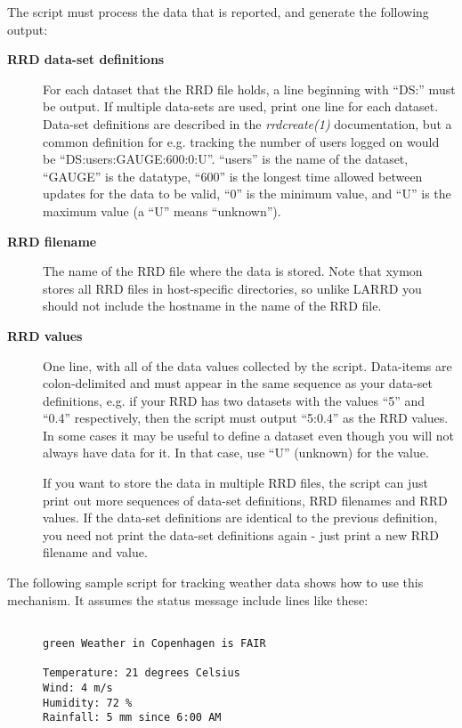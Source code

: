   The script must process the data that is reported, and generate the following output: 


 \begin{description}
\item[\textbf{RRD data-set definitions}
] For each dataset that the RRD file holds, a line beginning with ``DS:'' must be output. If multiple data-sets are used, print one line for each dataset.  
 Data-set definitions are described in the \emph{rrdcreate(1)}
 documentation, but a common definition for e.g. tracking the number of users logged on would be ``DS:users:GAUGE:600:0:U''. ``users'' is the name of the dataset, ``GAUGE'' is the datatype, ``600'' is the longest time allowed between updates for the data to be valid, ``0'' is the minimum value, and ``U'' is the maximum value (a ``U'' means ``unknown''). 
\item[\textbf{RRD filename}
] The name of the RRD file where the data is stored. Note that xymon stores all RRD files in host-specific directories, so unlike LARRD you should not include the hostname in the name of the RRD file. 
\item[\textbf{RRD values}
] One line, with all of the data values collected by the script. Data-items are colon-delimited and must appear in the same sequence as your data-set definitions, e.g. if your RRD has two datasets with the values ``5'' and ``0.4'' respectively, then the script must output ``5:0.4'' as the RRD values.  
 In some cases it may be useful to define a dataset even though you will not always have data for it. In that case, use ``U'' (unknown) for the value. 

  If you want to store the data in multiple RRD files, the script can just print out more sequences of data-set definitions, RRD filenames and RRD values. If the data-set definitions are identical to the previous definition, you need not print the data-set definitions again - just print a new RRD filename and value. 


 


\end{description}



  The following sample script for tracking weather data shows how to use this mechanism. It assumes the status message include lines like these: \begin{description}
\item[]\begin{verbatim}

green Weather in Copenhagen is FAIR

Temperature: 21 degrees Celsius
Wind: 4 m/s
Humidity: 72 %
Rainfall: 5 mm since 6:00 AM

\end{verbatim}


\end{description}



